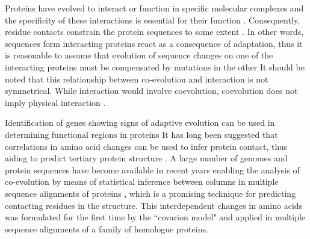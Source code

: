 Proteins have evolved to interact or function in specific molecular complexes and the specificity of these interactions is essential for their function \cite{pazos1997correlated}.
Consequently, residue contacts constrain the protein sequences to some extent \cite{pazos1997correlated}.
In other words, sequences form interacting proteins react as a consequence of adaptation, thus it is reasonable to assume that evolution of sequence changes on one of the interacting proteins must be compensated by mutations in the other \cite{pazos1997correlated}
It should be noted that this relationship between co-evolution and interaction is not symmetrical. 
While interaction would involve coevolution, coevolution does not imply physical interaction \cite{fares2006novel}.

Identification of genes showing signs of adaptive evolution can be used in determining functional regions in proteins \cite{fares2006novel}
It has long been suggested that correlations in amino acid changes can be used to infer protein contact, thus aiding to predict tertiary protein structure \cite{morcos2011direct, burger2010disentangling}.
A large number of genomes and protein sequences have become available in recent years enabling the analysis of co-evolution by means of statistical inference between columns in multiple sequence alignments of proteins \cite{burger2010disentangling, burger2010disentangling}, which is a promising technique for predicting contacting residues in the structure.
This interdependent changes in amino acids was formulated for the first time by the ``covarion model" \cite{fitch1970improved} and applied in multiple sequence alignments of a family of homologue proteins\cite{de2013emerging}.




